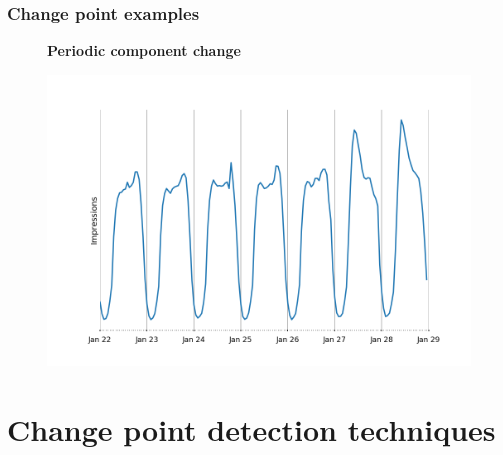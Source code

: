 \documentclass[intlimits, 9pt, unicode]{beamer}
\begin{document}
\begin{frame}
\frametitle{Change point examples}
\begin{figure}
\textbf{Periodic component change}\par\medskip
\includegraphics[scale=0.30]{images/006_structure}
\end{figure}
\end{frame}


\section{Change point detection techniques}







\end{document}
